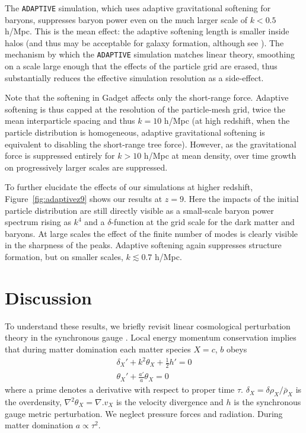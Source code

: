 \documentclass[a4paper,11pt]{article}
\begin{document}
The \texttt{ADAPTIVE} simulation, which uses adaptive gravitational softening for baryons, suppresses baryon power even on the much larger scale of $k < 0.5$ h/Mpc.
This is the mean effect: the adaptive softening length is smaller inside halos (and thus may be acceptable for galaxy formation, although see \cite{Fvdb:2018}). The mechanism by which the \texttt{ADAPTIVE} simulation matches linear theory, smoothing on a scale large enough that the effects of the particle grid are erased, thus substantially reduces the effective simulation resolution as a side-effect.

Note that the softening in Gadget affects only the short-range force. Adaptive softening is thus capped at the resolution of the particle-mesh grid, twice the mean interparticle spacing and thus $k = 10$ h/Mpc (at high redshift, when the particle distribution is homogeneous, adaptive gravitational softening is equivalent to disabling the short-range tree force). However, as the gravitational force is suppressed entirely for $ k > 10$ h/Mpc at mean density, over time growth on progressively larger scales are suppressed.


To further elucidate the effects of our simulations at higher redshift, Figure~\ref{fig:adaptivez9} shows our results at $z=9$. Here the impacts of the initial particle distribution are still directly visible as a small-scale baryon power spectrum rising as $k^4$ and a $\delta$-function at the grid scale for the dark matter and baryons. At large scales the effect of the finite number of modes is clearly visible in the sharpness of the peaks. Adaptive softening again suppresses structure formation, but on smaller scales, $k \lesssim 0.7$ h/Mpc.

\section{Discussion}
\label{sec:explanation}

To understand these results, we briefly revisit linear cosmological perturbation theory in the synchronous gauge \cite{Ma:1995}. Local energy momentum conservation implies that during matter domination each matter species $X = c$, $b$ obeys
\begin{align}
 \delta_X' + k^2 \theta_X + \frac{1}{2} h' = 0 \\
 \theta_X' + \frac{a'}{a} \theta_X = 0
\end{align}
where a prime denotes a derivative with respect to proper time $\tau$. $\delta_X = \delta \rho_X / \bar{\rho}_X$ is the overdensity, $\nabla^2 \theta_X = \nabla. v_X $ is the velocity divergence and $h$ is the synchronous gauge metric perturbation. We neglect pressure forces and radiation. During matter domination $a \propto \tau^2$.
\end{document}
